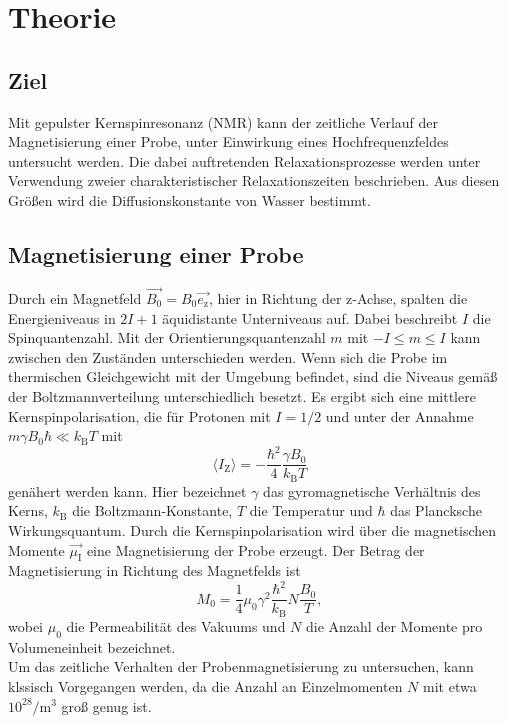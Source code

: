 \section{Theorie}
\label{sec:Theorie}
\subsection{Ziel}
Mit gepulster Kernspinresonanz (NMR) kann der zeitliche Verlauf der Magnetisierung
einer Probe, unter Einwirkung eines Hochfrequenzfeldes untersucht werden. Die
dabei auftretenden Relaxationsprozesse werden unter Verwendung zweier
charakteristischer Relaxationszeiten beschrieben.
Aus diesen Größen wird die Diffusionskonstante von Wasser bestimmt.
\subsection{Magnetisierung einer Probe}
Durch ein Magnetfeld $\vec{B_0}=B_0 \vec{e_\text{z}}$, hier in Richtung der z-Achse,
spalten die Energieniveaus
in $2I+1$ äquidistante Unterniveaus auf. Dabei beschreibt $I$ die Spinquantenzahl.
Mit der Orientierungsquantenzahl $m$ mit $-I \leq m \leq I$ kann zwischen
den Zuständen unterschieden werden. Wenn sich die Probe im thermischen
Gleichgewicht mit der Umgebung befindet, sind die Niveaus gemäß der Boltzmannverteilung
unterschiedlich besetzt. Es ergibt sich eine mittlere Kernspinpolarisation, die
für Protonen mit $I=1/2$  und unter der Annahme $m \gamma B_0 \hbar \ll k_\text{B} T$ mit
\begin{equation}
  \langle I_{\text{Z}} \rangle= -\frac{\hbar^2}{4}\frac{\gamma B_0}{k_\text{B} T}
\end{equation}
genähert werden kann. Hier bezeichnet $\gamma$ das gyromagnetische Verhältnis des Kerns,
$k_\text{B}$ die Boltzmann-Konstante, $T$ die Temperatur
und $\hbar$ das Plancksche Wirkungsquantum.
Durch die Kernspinpolarisation wird über die magnetischen Momente $\vec{\mu_\text{I}}$ eine Magnetisierung
der Probe erzeugt. Der Betrag der Magnetisierung in Richtung des Magnetfelds ist
\begin{equation}
  M_0 = \frac{1}{4} \mu_0 \gamma^2 \frac{\hbar^2}{k_\text{B}} N \frac{B_0}{T},
\end{equation}
wobei $\mu_0$ die Permeabilität des Vakuums und
$N$ die Anzahl der Momente pro Volumeneinheit bezeichnet.\\
Um das zeitliche Verhalten der Probenmagnetisierung zu untersuchen, kann klssisch
Vorgegangen werden, da die Anzahl an Einzelmomenten $N$ mit etwa $10^{28}/$m$^3$
groß genug ist.
